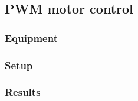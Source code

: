 \subsection{PWM motor control}
 
\subsubsection{Equipment}
 
\subsubsection{Setup}
 
\subsubsection{Results}